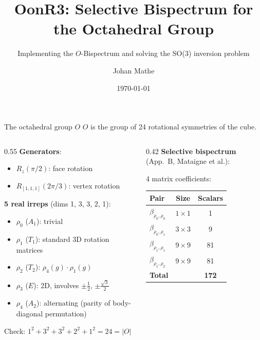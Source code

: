 \documentclass[aspectratio=169]{beamer}
\title{OonR3: Selective Bispectrum for the Octahedral Group}
\subtitle{Implementing the $O$-Bispectrum and solving the SO(3) inversion problem}
\author{Johan Mathe}
\date{\today}
\begin{document}
\maketitle

\begin{frame}{The octahedral group $O$}
  $O$ is the group of 24 rotational symmetries of the cube.

  \medskip

  \begin{columns}[T]
    \begin{column}{0.55\textwidth}
      \textbf{Generators}:
      \begin{itemize}
        \item $R_z(\pi/2)$: face rotation
        \item $R_{[1,1,1]}(2\pi/3)$: vertex rotation
      \end{itemize}

      \bigskip

      \textbf{5 real irreps} (dims 1, 3, 3, 2, 1):
      \begin{itemize}
        \item $\rho_0$ ($A_1$): trivial
        \item $\rho_1$ ($T_1$): standard 3D rotation matrices
        \item $\rho_2$ ($T_2$): $\rho_4(g) \cdot \rho_1(g)$
        \item $\rho_3$ ($E$): 2D, involves $\pm\tfrac{1}{2}$, $\pm\tfrac{\sqrt{3}}{2}$
        \item $\rho_4$ ($A_2$): alternating (parity of body-diagonal permutation)
      \end{itemize}

      \bigskip

      Check: $1^2 + 3^2 + 3^2 + 2^2 + 1^2 = 24 = |O|$ \quad\checkmark
    \end{column}
    \begin{column}{0.42\textwidth}
      \textbf{Selective bispectrum} (App.~B, Mataigne et al.):

      \medskip

      4 matrix coefficients:

      \smallskip

      \begin{tabular}{lcc}
        \toprule
        Pair & Size & Scalars \\
        \midrule
        $\beta_{\rho_0,\rho_0}$ & $1\times 1$ & 1 \\
        $\beta_{\rho_0,\rho_1}$ & $3\times 3$ & 9 \\
        $\beta_{\rho_1,\rho_1}$ & $9\times 9$ & 81 \\
        $\beta_{\rho_1,\rho_2}$ & $9\times 9$ & 81 \\
        \midrule
        \textbf{Total} & & \textbf{172} \\
        \bottomrule
      \end{tabular}


\end{column}
\end{columns}
\end{frame}
\end{document}
